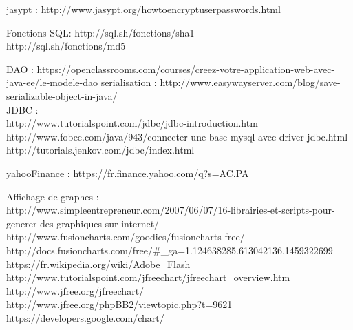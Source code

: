 jasypt :
http://www.jasypt.org/howtoencryptuserpasswords.html

Fonctions SQL:
http://sql.sh/fonctions/sha1 \\
http://sql.sh/fonctions/md5

DAO :
https://openclassrooms.com/courses/creez-votre-application-web-avec-java-ee/le-modele-dao
serialisation : 
http://www.easywayserver.com/blog/save-serializable-object-in-java/ \\

JDBC : \\
http://www.tutorialspoint.com/jdbc/jdbc-introduction.htm\\
http://www.fobec.com/java/943/connecter-une-base-mysql-avec-driver-jdbc.html
http://tutorials.jenkov.com/jdbc/index.html

yahooFinance : 
https://fr.finance.yahoo.com/q?s=AC.PA

Affichage de graphes :\\
http://www.simpleentrepreneur.com/2007/06/07/16-librairies-et-scripts-pour-generer-des-graphiques-sur-internet/ \\
http://www.fusioncharts.com/goodies/fusioncharts-free/ \\
http://docs.fusioncharts.com/free/\#\_ga=1.124638285.613042136.1459322699 \\
https://fr.wikipedia.org/wiki/Adobe\_Flash \\
http://www.tutorialspoint.com/jfreechart/jfreechart\_overview.htm \\
http://www.jfree.org/jfreechart/ \\
http://www.jfree.org/phpBB2/viewtopic.php?t=9621 \\
https://developers.google.com/chart/ 